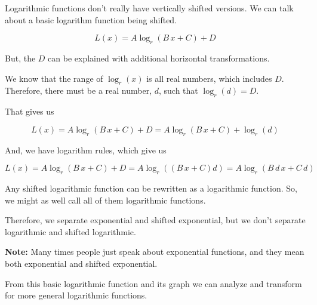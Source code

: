\documentclass{ximera}
\begin{document}
\begin{fact}


Logarithmic functions don't really have vertically shifted versions.  We can talk about a basic logarithm function being shifted.

\[
L(x) = A \log_r(B \, x + C) + D
\]


But, the $D$ can be explained with additional horizontal transformations. 


We know that the range of $\log_r(x)$ is all real numbers, which includes $D$.  Therefore, there must be a real number, $d$, such that $\log_r(d) = D$. 


That gives us 



\[
L(x) = A \log_r(B \, x + C) + D = A \log_r(B \, x + C) + \log_r(d)
\]

And, we have logarithm rules, which give us


\[
L(x) = A \log_r(B \, x + C) + D = A \log_r((B \, x + C)d) = A \log_r(B \, d \,  x + C \,  d) 
\]


Any shifted logarithmic function can be rewritten as a logarithmic function.  So, we might as well call all of them logarithmic functions. 

Therefore, we separate exponential and shifted exponential, but we don't separate logarithmic and shifted logarithmic.

\end{fact}


\textbf{Note:}  Many times people just speak about exponential functions, and they mean both exponential and shifted exponential.




















From this basic logarithmic function and its graph we can analyze and transform for more general logarithmic functions.
\end{document}
